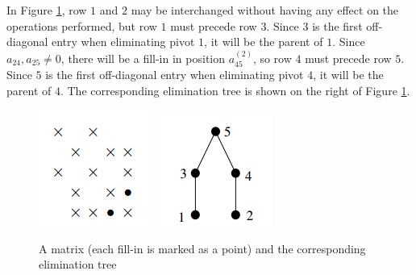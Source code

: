 \begin{exm}
    In Figure \ref{fig::emtree}, row $1$ and $2$ may be 
    interchanged without having any effect on the operations 
    performed, but row $1$ must precede row $3$. Since $3$ is 
    the first off-diagonal entry when eliminating pivot $1$, 
    it will be the parent of $1$. Since $a_{24},a_{25}\neq 0$, 
    there will be a fill-in in position $a_{45}^{(2)}$, so row 
    $4$ must precede row $5$. Since $5$ is the first 
    off-diagonal entry when eliminating pivot $4$, it will be 
    the parent of $4$. The corresponding elimination tree is 
    shown on the right of Figure \ref{fig::emtree}.
    \begin{figure}[H]
        \includegraphics[width=0.45\linewidth]{png/emtree1.png}
        \includegraphics[width=0.45\linewidth]{png/emtree2.png}
        \caption{A matrix (each fill-in is marked as a point) 
        and the corresponding elimination 
        tree}
        \label{fig::emtree}
    \end{figure}
\end{exm}

